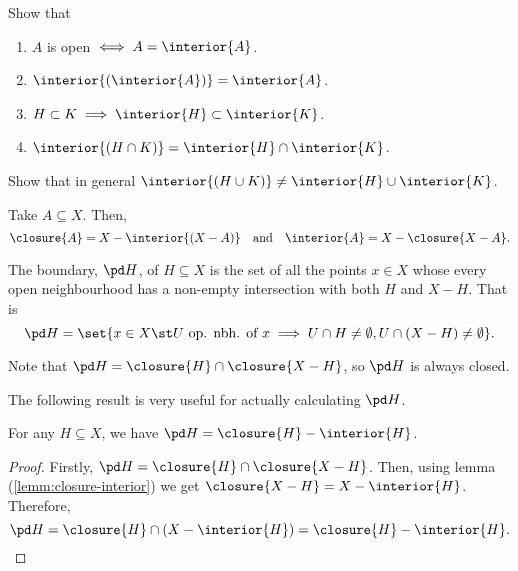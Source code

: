 \begin{exercise}
Show that
\begin{enumerate}
\item $A$ is open $\iff A = \interior{A}$.
\item $\interior{(\interior{A})} = \interior{A}$.
\item $H \subset K \implies \interior{H} \subset \interior{K}$.
\item $\interior{(H \cap K)} = \interior{H} \cap \interior{K}$.
\end{enumerate}
\end{exercise}

\begin{exercise}
  Show that in general $\interior{(H \cup K)} \neq \interior{H} \cup \interior{K}$.
\end{exercise}

\begin{nlemma}\label{lemm:closure-interior}
  Take $A \subseteq X$. Then,
  \begin{equation*}
    \closure{A} = X-\interior{(X-A)}
    \quad\text{and}\quad
    \interior{A} = X-\closure{X-A}.
  \end{equation*}
\end{nlemma}

\begin{ndfn}
  The boundary, $\pd H$, of $H \subseteq X$ is the set of all the points $x \in X$ whose every open neighbourhood has a non-empty intersection with both $H$ and $X-H$. That is
  \begin{equation*}
  \pd H = \set{x \in X \st U \text{ op. nbh. of }x \implies U \cap H \neq \emptyset, U \cap (X-H) \neq \emptyset}.
  \end{equation*}
\end{ndfn}

Note that $\pd H = \closure{H} \cap \closure{X-H}$, so $\pd H$ is always closed.

The following result is very useful for actually calculating $\pd H$.
\begin{nlemma}
  For any $H \subseteq X$, we have $\pd H = \closure{H} - \interior{H}$.
\end{nlemma}
\begin{proof}
  Firstly, $\pd H = \closure{H} \cap \closure{X-H}$. Then, using lemma (\ref{lemm:closure-interior}) we get $\closure{X-H} = X - \interior{H}$. Therefore,
  \begin{equation*}
  \pd H = \closure{H} \cap (X-\interior{H}) = \closure{H}-\interior{H}.
  \end{equation*}
\end{proof}

